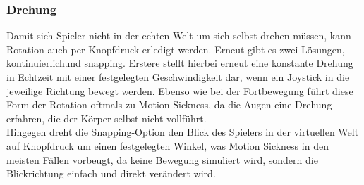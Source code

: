 \subsubsection{Drehung}
Damit sich Spieler nicht in der echten Welt um sich selbst drehen müssen, kann Rotation auch per Knopfdruck erledigt werden. Erneut gibt es zwei Lösungen, \dq kontinuierlich\dq und \dq snapping\dq . Erstere stellt hierbei erneut eine konstante Drehung in Echtzeit mit einer festgelegten Geschwindigkeit dar, wenn ein Joystick in die jeweilige Richtung bewegt werden. Ebenso wie bei der Fortbewegung führt diese Form der Rotation oftmals zu Motion Sickness, da die Augen eine Drehung erfahren, die der Körper selbst nicht vollführt.\\
Hingegen dreht die Snapping-Option den Blick des Spielers in der virtuellen Welt auf Knopfdruck um einen festgelegten Winkel, was Motion Sickness in den meisten Fällen vorbeugt, da keine Bewegung simuliert wird, sondern die Blickrichtung einfach und direkt verändert wird.


